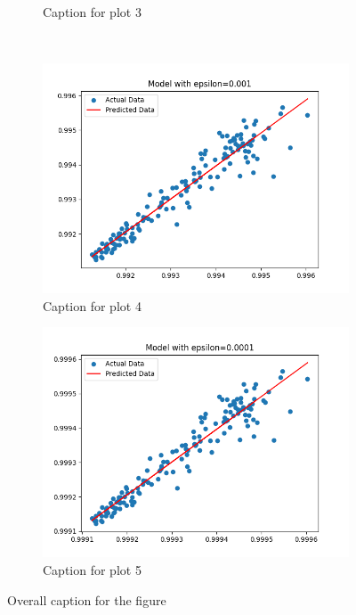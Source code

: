 \begin{figure}[h!]
\begin{subfigure}[b]{0.3\textwidth}
            \caption{Caption for plot 3}
        \end{subfigure}\\
        \begin{subfigure}[b]{0.3\textwidth}
            \includegraphics[width=.8\linewidth]{plots/epsilon_0.001}
            \caption{Caption for plot 4}
        \end{subfigure} \quad
        \begin{subfigure}[b]{0.3\textwidth}
            \includegraphics[width=.8\linewidth]{plots/epsilon_0.0001}
            \caption{Caption for plot 5}
        \end{subfigure}
        \caption{Overall caption for the figure}
    \end{figure}

